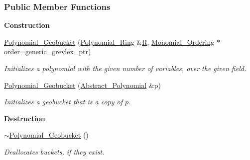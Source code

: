 \subsubsection*{Public Member Functions}
\begin{Indent}\textbf{ Construction}\par
\begin{DoxyCompactItemize}
\item 
\mbox{\label{group__polygroup_a1ddbd2520d7fa5b27ef27c66833fe074}} 
\hyperlink{group__polygroup_a1ddbd2520d7fa5b27ef27c66833fe074}{Polynomial\+\_\+\+Geobucket} (\hyperlink{group__polygroup_class_polynomial___ring}{Polynomial\+\_\+\+Ring} \&\hyperlink{group__polygroup_a551ade20b7dcd96c227dd0401f6ffbbe}{R}, \hyperlink{group__orderinggroup_class_monomial___ordering}{Monomial\+\_\+\+Ordering} $\ast$order=generic\+\_\+grevlex\+\_\+ptr)
\begin{DoxyCompactList}\small\item\em Initializes a polynomial with the given number of variables, over the given field. \end{DoxyCompactList}\item 
\mbox{\label{group__polygroup_a220910eae57ee32ec35a56344e3297b6}} 
\hyperlink{group__polygroup_a220910eae57ee32ec35a56344e3297b6}{Polynomial\+\_\+\+Geobucket} (\hyperlink{group__polygroup_class_abstract___polynomial}{Abstract\+\_\+\+Polynomial} \&p)
\begin{DoxyCompactList}\small\item\em Initializes a geobucket that is a copy of $p$. \end{DoxyCompactList}\end{DoxyCompactItemize}
\end{Indent}
\begin{Indent}\textbf{ Destruction}\par
\begin{DoxyCompactItemize}
\item 
\mbox{\label{group__polygroup_aa943e78f99a7e6d61ed5d962f05d34b1}} 
\hyperlink{group__polygroup_aa943e78f99a7e6d61ed5d962f05d34b1}{$\sim$\+Polynomial\+\_\+\+Geobucket} ()
\begin{DoxyCompactList}\small\item\em Deallocates buckets, if they exist. \end{DoxyCompactList}\end{DoxyCompactItemize}
\end{Indent}
